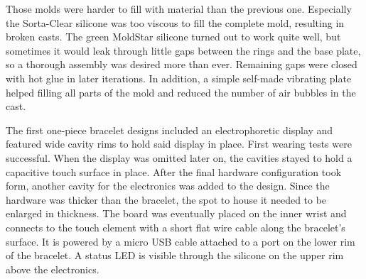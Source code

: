 Those molds were harder to fill with material than the previous one. Especially the Sorta-Clear silicone was too viscous to fill the complete mold, resulting in broken casts. The green MoldStar silicone turned out to work quite well, but sometimes it would leak through little gaps between the rings and the base plate, so a thorough assembly was desired more than ever. Remaining gaps were closed with hot glue in later iterations. In addition, a simple self-made vibrating plate helped filling all parts of the mold and reduced the number of air bubbles in the cast. 

The first one-piece bracelet designs included an electrophoretic display and featured wide cavity rims to hold said display in place. First wearing tests were successful. When the display was omitted later on, the cavities stayed to hold a capacitive touch surface in place. After the final hardware configuration took form, another cavity for the electronics was added to the design. Since the hardware was thicker than the bracelet, the spot to house it needed to be enlarged in thickness. The board was eventually placed on the inner wrist and connects to the touch element with a short flat wire cable along the bracelet's surface. It is powered by a micro USB cable attached to a port on the lower rim of the bracelet. A status \ac{LED} is visible through the silicone on the upper rim above the electronics.

